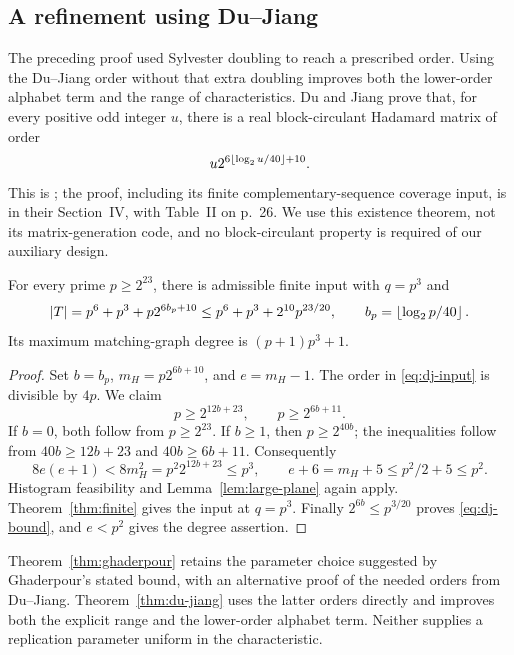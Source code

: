\subsection{A refinement using Du--Jiang}

The preceding proof used Sylvester doubling to reach a prescribed order. Using the Du--Jiang order without that extra doubling improves both the lower-order alphabet term and the range of characteristics.
Du and Jiang prove that, for every positive odd integer $u$, there is a real block-circulant Hadamard matrix of order
\begin{equation}\label{eq:dj-input}
 u2^{6\left\lfloor \log_2u/40\right\rfloor+10}.
\end{equation}
This is \cite[Theorem~3, p.~18]{DJ24}; the proof, including its finite complementary-sequence coverage input, is in their Section~IV, with Table~II on p.~26. We use this existence theorem, not its matrix-generation code, and no block-circulant property is required of our auxiliary design.

\begin{theorem}\label{thm:du-jiang}
For every prime $p\ge2^{23}$, there is admissible finite input with $q=p^3$ and
\begin{equation}\label{eq:dj-bound}
 |T|=p^6+p^3+p2^{6b_p+10}
 \le p^6+p^3+2^{10}p^{23/20},
 \qquad b_p=\left\lfloor \log_2p/40\right\rfloor.
\end{equation}
Its maximum matching-graph degree is $(p+1)p^3+1$.
\end{theorem}
\begin{proof}
Set $b=b_p$, $m_H=p2^{6b+10}$, and $e=m_H-1$. The order in \eqref{eq:dj-input} is divisible by $4p$. We claim
\[
 p\ge2^{12b+23},\qquad p\ge2^{6b+11}.
\]
If $b=0$, both follow from $p\ge2^{23}$. If $b\ge1$, then $p\ge2^{40b}$; the inequalities follow from $40b\ge12b+23$ and $40b\ge6b+11$. Consequently
\[
 8e(e+1)<8m_H^2=p^2 2^{12b+23}\le p^3,
 \qquad e+6=m_H+5\le p^2/2+5\le p^2.
\]
Histogram feasibility and Lemma~\ref{lem:large-plane} again apply. Theorem~\ref{thm:finite} gives the input at $q=p^3$. Finally $2^{6b}\le p^{3/20}$ proves \eqref{eq:dj-bound}, and $e<p^2$ gives the degree assertion.
\end{proof}

Theorem~\ref{thm:ghaderpour} retains the parameter choice suggested by Ghaderpour's stated bound, with an alternative proof of the needed orders from Du--Jiang. Theorem~\ref{thm:du-jiang} uses the latter orders directly and improves both the explicit range and the lower-order alphabet term. Neither supplies a replication parameter uniform in the characteristic.

